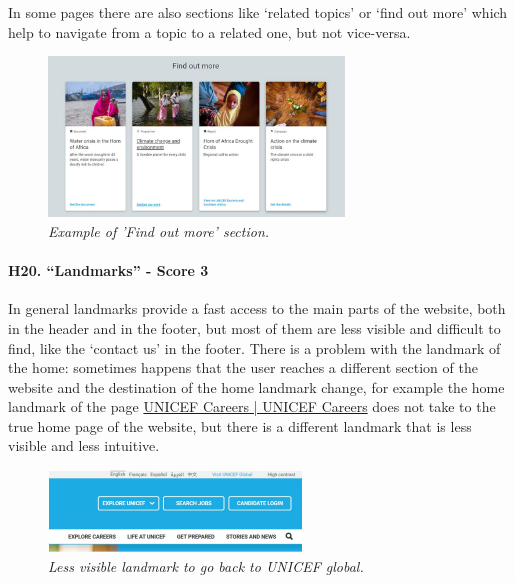 \newline In some pages there are also sections like ‘related topics’ or ‘find out more’ which help to navigate from a topic to a related one, but not vice-versa.
\begin{figure}[!h]
	\begin{center}
		\includegraphics[width=0.7\textwidth]{FinalScores22.jpg}
		\captionsetup{font=small}
		\caption{\textit{Example of 'Find out more' section.}}
	\end{center}
\end{figure}
\newline
\newline \paragraph{H20. “Landmarks” - Score 3}	In general landmarks provide a fast access to the main parts of the website, both in the header and in the footer, but most of them are less visible and difficult to find, like the ‘contact us’ in the footer.
\newline There is a problem with the landmark of the home: sometimes happens that the user reaches a different section of the website and the destination of the home landmark change, for example the home landmark of the page \href{https://www.unicef.org/careers/}{UNICEF Careers | UNICEF Careers} does not take to the true home page of the website, but there is a different landmark that is less visible and less intuitive.
\begin{figure}[!h]
	\begin{center}
		\includegraphics[width=0.6\textwidth]{FinalScores23.jpg}
		\captionsetup{font=small}
		\caption{\textit{Less visible landmark to go back to UNICEF global.}}
	\end{center}
\end{figure}
